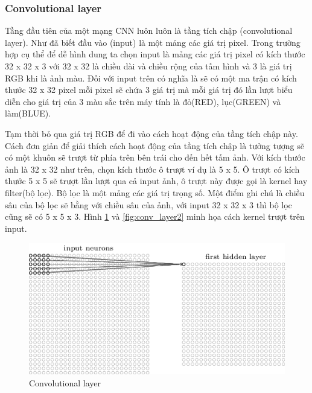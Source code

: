 	\subsubsection{Convolutional layer}
		Tầng đầu tiên của một mạng CNN luôn luôn là tầng tích chập (convolutional layer)\cite{conv}. Như đã biết đầu vào (input) là một mảng các giá trị pixel. Trong trường hợp cụ thể để dễ hình dung ta chọn input là mảng các giá trị pixel có kích thước 32 x 32 x 3 với 32 x 32 là chiều dài và chiều rộng của tấm hình và 3 là giá trị RGB khi là ảnh màu. Đối với input trên có nghĩa là sẽ có một ma trận có kích thước 32 x 32 pixel mỗi pixel sẽ chứa 3 giá trị mà mỗi giá trị đó lần lượt biểu diễn cho giá trị của 3 màu sắc trên máy tính là đỏ(RED), lục(GREEN) và làm(BLUE). \par
		Tạm thời bỏ qua giá trị RGB để đi vào cách hoạt động của tầng tích chập này. Cách đơn giản để giải thích cách hoạt động của tầng tích chập là tưởng tượng sẽ có một khuôn sẽ trượt từ phía trên bên trái cho đến hết tấm ảnh\cite{arch}. Với kích thước ảnh là 32 x 32 như trên, chọn kích thước ô trượt ví dụ là 5 x 5. Ô trượt có kích thước 5 x 5 sẽ trượt lần lượt qua cả input ảnh, ô trượt này được gọi là kernel hay filter(bộ lọc). Bộ lọc là một mảng các giá trị trọng số. Một điểm ghi chú là chiều sâu của bộ lọc sẽ bằng với chiều sâu của ảnh, với input 32 x 32 x 3 thì bộ lọc cũng sẽ có 5 x 5 x 3. Hình \ref{fig:conv_layer1} và \ref{fig:conv_layer2} minh họa cách kernel trượt trên input.
		\begin{figure}[h!]
			\centering
			\includegraphics[scale=0.8]{charts/conv_layer1.png}
			\caption{Convolutional layer}
			\label{fig:conv_layer1}
		\end{figure}
		
